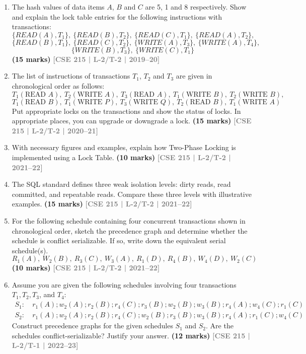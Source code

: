 \documentclass[12pt,a3paper]{article}
\newcommand{\yr}[1]{\hfill\textcolor{gray}{\small\textbf{[#1]}}}
\newcommand{\mk}[1]{\textcolor{orange!70!black}{\small\textbf{(#1 marks)}}}
\begin{document}
\begin{enumerate}
\item The hash values of data items $A$, $B$ and $C$ are 5, 1 and 8 respectively. Show and explain the lock table entries for the following instructions with transactions:
\[\{READ(A), T_1\},\ \{READ(B), T_2\},\ \{READ(C), T_1\},\ \{READ(A), T_2\},\]
\[\{READ(B), T_1\},\ \{READ(C), T_2\},\ \{WRITE(A), T_3\},\ \{WRITE(A), T_4\},\]
\[\{WRITE(B), T_3\},\ \{WRITE(C), T_1\}\]
\mk{15} \yr{CSE 215 | L-2/T-2 | 2019--20}

\item The list of instructions of transactions $T_1$, $T_2$ and $T_3$ are given in chronological order as follows:
\[T_1(\text{READ }A),\ T_2(\text{WRITE }A),\ T_3(\text{READ }A),\ T_1(\text{WRITE }B),\ T_2(\text{WRITE }B),\]
\[T_1(\text{READ }B),\ T_1(\text{WRITE }P),\ T_3(\text{WRITE }Q),\ T_2(\text{READ }B),\ T_1(\text{WRITE }A)\]
Put appropriate locks on the transactions and show the status of locks. In appropriate places, you can upgrade or downgrade a lock.
  \mk{15} \yr{CSE 215 | L-2/T-2 | 2020--21}

\item With necessary figures and examples, explain how Two-Phase Locking is implemented using a Lock Table.
\mk{10} \yr{CSE 215 | L-2/T-2 | 2021--22}

\item The SQL standard defines three weak isolation levels: dirty reads, read committed, and repeatable reads. Compare these three levels with illustrative examples.
\mk{15} \yr{CSE 215 | L-2/T-2 | 2021--22}

\item For the following schedule containing four concurrent transactions shown in chronological order, sketch the precedence graph and determine whether the schedule is conflict serializable. If so, write down the equivalent serial schedule(s).
\[R_1(A),\ W_2(B),\ R_3(C),\ W_3(A),\ R_1(D),\ R_4(B),\ W_4(D),\ W_2(C)\]
  \mk{10} \yr{CSE 215 | L-2/T-2 | 2021--22}

\item Assume you are given the following schedules involving four transactions $T_1, T_2, T_3$, and $T_4$:
\begin{align*}
S_1\colon &\ r_1(A); w_2(A); r_2(B); r_4(C); r_3(B); w_2(B); w_3(B); r_4(A); w_4(C); r_1(C)\\
S_2\colon &\ r_1(A); w_2(A); r_2(B); r_4(C); w_2(B); r_3(B); w_3(B); r_4(A); r_1(C); w_4(C)
\end{align*}
Construct precedence graphs for the given schedules $S_1$ and $S_2$. Are the schedules conflict-serializable? Justify your answer.
  \mk{12} \yr{CSE 215 | L-2/T-1 | 2022--23}


\end{enumerate}
\end{document}
